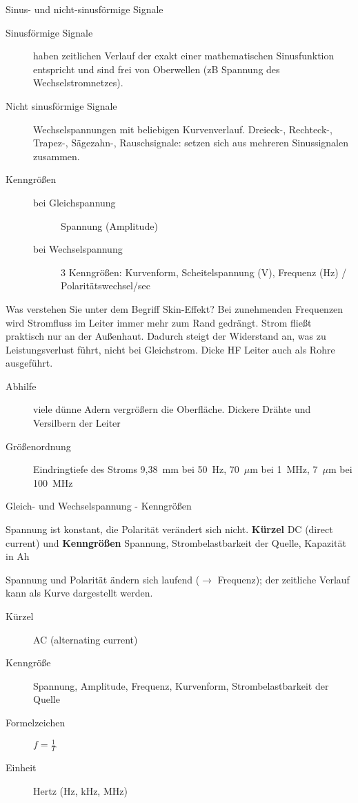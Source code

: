 \documentclass[avery5371,grid,frame,a4paper]{flashcards}
\newcommand{\card}[3]{
  \begin{flashcard}[{\chap} -- #1]{#2}#3\end{flashcard}
}
\begin{document}
\card{07}{Sinus- und nicht-sinusförmige Signale}{
  \footnotesize
  \begin{description}
    \item[Sinusförmige Signale] haben zeitlichen Verlauf der exakt einer mathematischen Sinusfunktion entspricht und sind frei von Oberwellen (zB Spannung des Wechselstromnetzes).
    \item[Nicht sinusförmige Signale]
      Wechselspannungen mit beliebigen Kurvenverlauf.
      Dreieck-, Rechteck-, Trapez-, Sägezahn-, Rauschsignale: setzen sich aus mehreren Sinussignalen zusammen.
    \item[Kenngrößen] \hfill{}
      \begin{description}
        \item[bei Gleichspannung] Spannung (Amplitude)
        \item[bei Wechselspannung] 3 Kenngrößen: Kurvenform, Scheitelspannung (V), Frequenz (Hz) / Polaritätswechsel/sec
      \end{description}
  \end{description}
}

\card{08}{Was verstehen Sie unter dem Begriff Skin-Effekt?}{
  Bei zunehmenden Frequenzen wird Stromfluss im Leiter immer mehr zum Rand gedrängt.
  Strom fließt praktisch nur an der Außenhaut.
  Dadurch steigt der Widerstand an, was zu Leistungsverlust führt, nicht bei Gleichstrom.
  Dicke HF Leiter auch als Rohre ausgeführt.
  \begin{description}
    \item[Abhilfe] viele dünne Adern vergrößern die Oberfläche. Dickere Drähte und Versilbern der Leiter
    \item[Größenordnung] Eindringtiefe des Stroms
      9,38~mm bei 50~Hz, 70~$\mu$m bei 1~MHz, 7~$\mu$m bei 100~MHz
  \end{description}
}

\card{09}{Gleich- und Wechselspannung - Kenngrößen}{
  \footnotesize
  \begin{description}\itemsep0pt
    \item[Gleichspannung] Spannung ist konstant, die Polarität verändert sich nicht. \textbf{Kürzel} DC (direct current) und \textbf{Kenngrößen} Spannung, Strombelastbarkeit der Quelle, Kapazität in Ah
    \item[Wechselspannung]\itemsep0pt
      Spannung und Polarität ändern sich laufend ($\rightarrow$ Frequenz); der zeitliche Verlauf kann als Kurve dargestellt werden. 
      \begin{description}
        \item[Kürzel] AC (alternating current)
        \item[Kenngröße] Spannung, Amplitude, Frequenz, Kurvenform, Strombelastbarkeit der Quelle
        \item[Formelzeichen] $f = \frac1T$
        \item[Einheit] Hertz (Hz, kHz, MHz)
      \end{description}
  \end{description}
}
\end{document}
